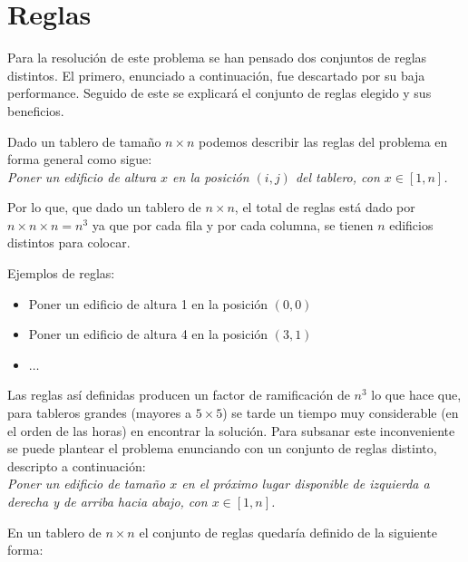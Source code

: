 \documentclass[%
    final,
    reprint,
    notitlepage,
    narroweqnarray,
    inline,
    twoside,
    invited
    ]{ieee}
\begin{document}
\section{Reglas}

\par Para la resolución de este problema se han pensado dos conjuntos de reglas distintos. El primero, enunciado a continuación, fue descartado por su baja performance. Seguido de este se explicará el conjunto de reglas elegido y sus beneficios.\\

\par Dado un tablero de tamaño $n\times n$ podemos describir las reglas del problema en forma general como sigue:\\

\emph{Poner un edificio de altura $x$ en la posición $(i,j)$ del tablero, con $x \in [1, n]$.}\\

\par Por lo que, que dado un tablero de $n\times n$, el total de reglas está dado por $n \times {n \times n} = n^3$ ya que por cada fila y por cada columna, se tienen $n$ edificios distintos para colocar. 
\par Ejemplos de reglas:
\begin{itemize}
\item Poner un edificio de altura 1 en la posición $(0,0)$
\item Poner un edificio de altura 4 en la posición $(3,1)$
\item $\ldots$

\end{itemize}

\par Las reglas así definidas producen un factor de ramificación de $n^3$ lo que hace que, para tableros grandes (mayores a $5\times5$) se tarde un tiempo muy considerable (en el orden de las horas) en encontrar la solución. Para subsanar este inconveniente se puede plantear el problema enunciando con un conjunto de reglas distinto, descripto a continuación:\\

\emph{Poner un edificio de tamaño $x$ en el próximo lugar disponible de izquierda a derecha y de arriba hacia abajo, con $x \in [1, n]$.}\\

\par En un tablero de $n\times n$ el conjunto de reglas quedaría definido de la siguiente forma:\\
\end{document}
